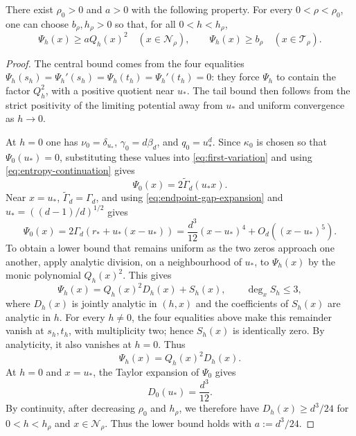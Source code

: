 \begin{lemma}
\label{lem:first-variation-bound}
There exist $\rho_0>0$ and $a>0$ with the following property.  For every
$0<\rho<\rho_0$, one can choose $b_\rho,h_\rho>0$ so that, for all
$0<h<h_\rho$,
\begin{equation*}
  \Psi_h(x)\ge a Q_h(x)^2
  \quad(x\in\mathcal N_\rho),
  \qquad
  \Psi_h(x)\ge b_\rho
  \quad(x\in\mathcal T_\rho).
\end{equation*}
\end{lemma}

\begin{proof}
The central bound comes from the four equalities
$\Psi_h(s_h)=\Psi_h'(s_h)=\Psi_h(t_h)=\Psi_h'(t_h)=0$: they force
$\Psi_h$ to contain the factor $Q_h^2$, with a positive quotient near $u_*$.
The tail bound then follows from the strict positivity of the limiting
potential away from $u_*$ and uniform convergence as $h\to0$.

At $h=0$ one has $\nu_0=\delta_{u_*}$, $\gamma_0=d\beta_d$, and
$q_0=u_*^d$.  Since $\kappa_0$ is chosen so that
$\Psi_0(u_*)=0$, substituting these values into
\eqref{eq:first-variation} and using
\eqref{eq:entropy-continuation} gives
\begin{equation}\label{eq:endpoint-first-variation}
  \Psi_0(x)=2\widetilde\Gamma_d(u_*x).
\end{equation}
Near $x=u_*$, $\widetilde\Gamma_d=\Gamma_d$, and using
\eqref{eq:endpoint-gap-expansion} and
$u_*=((d-1)/d)^{1/2}$ gives
\begin{equation*}
  \Psi_0(x)
  =2\Gamma_d(r_*+u_*(x-u_*))
  =\frac{d^3}{12}(x-u_*)^4+O_d((x-u_*)^5).
\end{equation*}
To obtain a lower bound that remains uniform as the two zeros approach one
another, apply analytic division, on a neighbourhood of $u_*$, to $\Psi_h(x)$
by the monic polynomial $Q_h(x)^2$.  This gives
\[
  \Psi_h(x)=Q_h(x)^2D_h(x)+S_h(x),
  \qquad \deg_xS_h\le3,
\]
where $D_h(x)$ is jointly analytic in $(h,x)$ and the coefficients of
$S_h(x)$ are analytic in $h$.  For every $h\ne0$, the four equalities above
make this remainder vanish at $s_h,t_h$, with multiplicity two;
hence $S_h(x)$ is identically zero.  By analyticity, it also vanishes at
$h=0$.  Thus
\[
  \Psi_h(x)=Q_h(x)^2D_h(x).
\]
At $h=0$ and $x=u_*$, the Taylor expansion of $\Psi_0$ gives
\[
  D_0(u_*)=\frac{d^3}{12}.
\]
By continuity, after decreasing $\rho_0$ and $h_\rho$, we therefore have
$D_h(x)\ge d^3/24$ for $0<h<h_\rho$ and $x\in\mathcal N_\rho$.  Thus the
lower bound holds with $a:=d^3/24$.


\end{proof}
